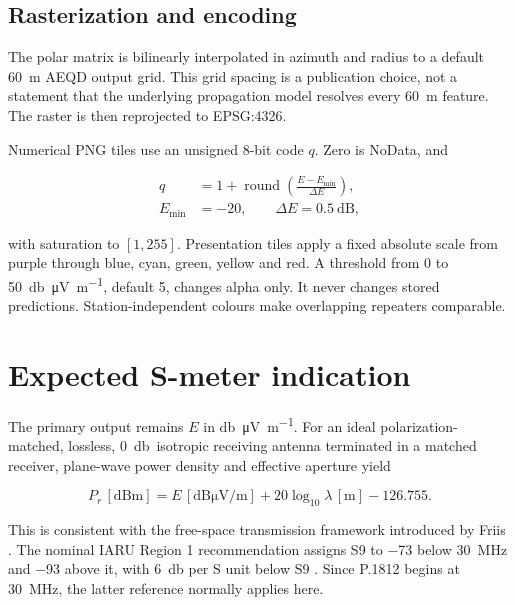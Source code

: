\documentclass[10pt,a4paper,twocolumn]{article}
\begin{document}
\subsection{Rasterization and encoding}

The polar matrix is bilinearly interpolated in azimuth and radius to a default
\SI{60}{\meter} AEQD output grid. This grid spacing is a publication choice,
not a statement that the underlying propagation model resolves every
\SI{60}{\meter} feature. The raster is then reprojected to EPSG:4326.

Numerical PNG tiles use an unsigned 8-bit code $q$. Zero is NoData, and

\begin{equation}
\begin{aligned}
q &= 1 + \operatorname{round}
  \left(\frac{E-E_{\min}}{\Delta E}\right),\\
E_{\min}&=-20,\qquad \Delta E=0.5\ \mathrm{dB},
\end{aligned}
\label{eq:quantize}
\end{equation}

with saturation to $[1,255]$. Presentation tiles apply a fixed absolute scale
from purple through blue, cyan, green, yellow and red. A threshold from 0 to
\SI{50}{\decibel\micro\volt\per\meter}, default 5, changes alpha only. It never
changes stored predictions. Station-independent colours make overlapping
repeaters comparable.

\section{Expected S-meter indication}

The primary output remains $E$ in \si{\decibel\micro\volt\per\meter}. For an
ideal polarization-matched, lossless, \SI{0}{\decibel isotropic} receiving
antenna terminated in a matched receiver, plane-wave power density and
effective aperture yield

\begin{equation}
P_r\,[\mathrm{dBm}] = E\,[\mathrm{dB\mu V/m}]
 +20\log_{10}\lambda\,[\mathrm{m}] -126.755.
\label{eq:fieldpower}
\end{equation}

This is consistent with the free-space transmission framework introduced by
Friis \cite{friis1946}. The nominal IARU Region 1 recommendation assigns S9 to
\SI{-73}{\dBm} below \SI{30}{\mega\hertz} and
\SI{-93}{\dBm} above it, with \SI{6}{\decibel} per S unit below
S9 \cite{iaru_smeter}. Since P.1812 begins at \SI{30}{\mega\hertz}, the latter
reference normally applies here.
\end{document}
